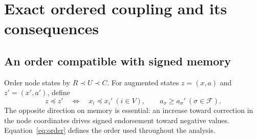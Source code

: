 \documentclass[final,5p,times,twocolumn,sort&compress]{elsarticle}
\theoremstyle{plain}
\newcommand{\Fset}{\mathcal{F}}
\begin{document}
\section{Exact ordered coupling and its consequences}
\label{sec:theory}
\subsection{An order compatible with signed memory}
Order node states by $R\prec U\prec C$. For augmented states $z=(x,a)$ and $z'=(x',a')$, define
\begin{equation}
 z\preceq z'\quad\Longleftrightarrow\quad
 x_i\preceq x_i'\ (i\in V),\qquad
 a_\sigma\ge a_\sigma'\ (\sigma\in\Fset).
 \label{eq:order}
\end{equation}
The opposite direction on memory is essential: an increase toward correction in the node coordinates drives signed endorsement toward negative values. Equation~\ref{eq:order} defines the order used throughout the analysis.
\end{document}
